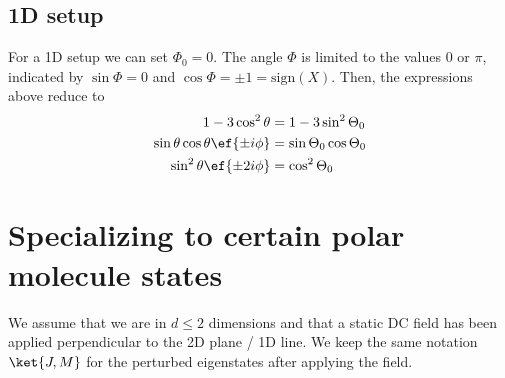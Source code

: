 
\subsection{1D setup}
For a 1D setup we can set $\Phi_0=0$. The angle $\Phi$ is limited
to the values $0$ or $\pi$, indicated by $\sin\Phi=0$ and
$\cos\Phi=\pm 1=\text{sign}(X)$. Then, the expressions above reduce to
\begin{align}
    1-3\cos^2\theta &= 1-3\sin^2\Theta_0 \\
    \sin\theta\cos\theta \ef{\pm i\phi} &= \sin\Theta_0 \cos\Theta_0 \\
    \sin^2\theta \ef{\pm 2i\phi} &= \cos^2 \Theta_0
\end{align}

\section{Specializing to certain polar molecule states}
We assume that we are in $d\le 2$ dimensions and that a static DC field has been applied perpendicular to the 2D plane / 1D line. We keep the same notation $\ket{J,M}$ for the perturbed eigenstates after applying the field.

